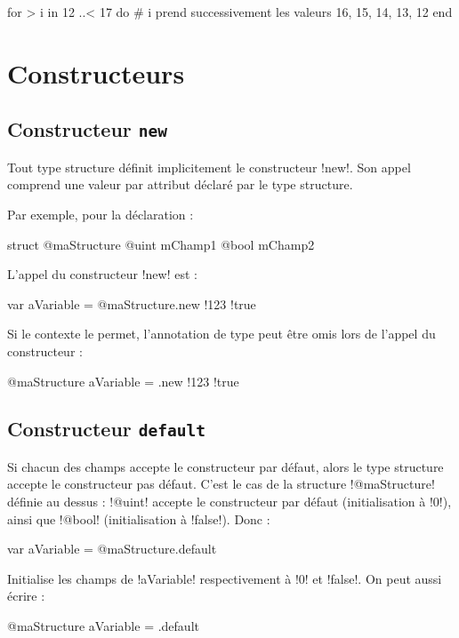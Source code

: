 \begin{galgas}
for > i in 12 ..< 17 do
  # i prend successivement les valeurs 16, 15, 14, 13, 12
end
\end{galgas}
 


\section{Constructeurs}

\subsection{Constructeur \texttt{new}}

Tout type structure définit implicitement le constructeur \ggs!new!. Son appel comprend une valeur par attribut déclaré par le type structure.

Par exemple, pour la déclaration :
\begin{galgas}
struct @maStructure
  @uint mChamp1
  @bool mChamp2
\end{galgas}

L'appel du constructeur \ggs!new! est :
\begin{galgas}
var aVariable = @maStructure.new {!123 !true}
\end{galgas}

Si le contexte le permet, l'annotation de type peut être omis lors de l'appel du constructeur :
\begin{galgas}
@maStructure aVariable = .new {!123 !true}
\end{galgas}


\subsection{Constructeur \texttt{default}}

Si chacun des champs accepte le constructeur par défaut, alors le type structure accepte le constructeur pas défaut. C'est le cas de la structure \ggs!@maStructure! définie au dessus : \ggs!@uint! accepte le constructeur par défaut (initialisation à \ggs!0!), ainsi que \ggs!@bool! (initialisation à \ggs!false!). Donc :
\begin{galgas}
var aVariable = @maStructure.default
\end{galgas}
Initialise les champs de \ggs!aVariable! respectivement à \ggs!0! et \ggs!false!. On peut aussi écrire :
\begin{galgas}
@maStructure aVariable = .default
\end{galgas}


